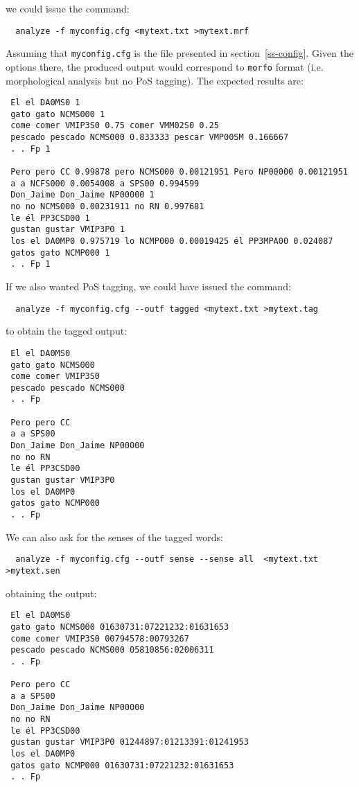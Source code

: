 \documentclass[a4paper]{book}
\begin{document}
\noindent we could issue the command:
\begin{verbatim}
  analyze -f myconfig.cfg <mytext.txt >mytext.mrf
\end{verbatim}
   Assuming that {\tt myconfig.cfg} is the file presented in
   section~\ref{ss-config}. Given the options there, the produced
   output would correspond to {\tt morfo} format (i.e. morphological
   analysis but no PoS tagging). The expected results are:
{\small
\begin{verbatim}
 El el DA0MS0 1 
 gato gato NCMS000 1 
 come comer VMIP3S0 0.75 comer VMM02S0 0.25 
 pescado pescado NCMS000 0.833333 pescar VMP00SM 0.166667 
 . . Fp 1 

 Pero pero CC 0.99878 pero NCMS000 0.00121951 Pero NP00000 0.00121951 
 a a NCFS000 0.0054008 a SPS00 0.994599 
 Don_Jaime Don_Jaime NP00000 1 
 no no NCMS000 0.00231911 no RN 0.997681 
 le él PP3CSD00 1 
 gustan gustar VMIP3P0 1 
 los el DA0MP0 0.975719 lo NCMP000 0.00019425 él PP3MPA00 0.024087 
 gatos gato NCMP000 1 
 . . Fp 1 

\end{verbatim}
}

\noindent If we also wanted PoS tagging, we could have issued the command:
\begin{verbatim}
  analyze -f myconfig.cfg --outf tagged <mytext.txt >mytext.tag
\end{verbatim}
\noindent  to obtain the tagged output:
{\small 
\begin{verbatim}
 El el DA0MS0
 gato gato NCMS000
 come comer VMIP3S0
 pescado pescado NCMS000
 . . Fp

 Pero pero CC
 a a SPS00
 Don_Jaime Don_Jaime NP00000
 no no RN
 le él PP3CSD00
 gustan gustar VMIP3P0
 los el DA0MP0
 gatos gato NCMP000
 . . Fp

\end{verbatim}
}

\noindent We can also ask for the senses of the tagged words:
\begin{verbatim}
  analyze -f myconfig.cfg --outf sense --sense all  <mytext.txt >mytext.sen
\end{verbatim}
\noindent obtaining the output:
{\small 
\begin{verbatim}
 El el DA0MS0
 gato gato NCMS000 01630731:07221232:01631653
 come comer VMIP3S0 00794578:00793267
 pescado pescado NCMS000 05810856:02006311
 . . Fp

 Pero pero CC
 a a SPS00
 Don_Jaime Don_Jaime NP00000
 no no RN
 le él PP3CSD00
 gustan gustar VMIP3P0 01244897:01213391:01241953
 los el DA0MP0
 gatos gato NCMP000 01630731:07221232:01631653
 . . Fp

\end{verbatim}
}
\end{document}
